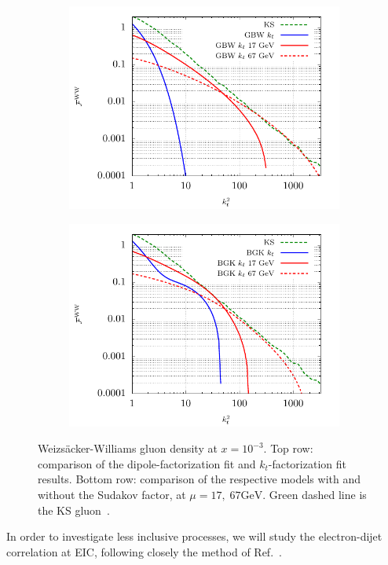 \documentclass[11pt]{article}
\numberwithin{equation}{section}
\numberwithin{table}{section}
\numberwithin{figure}{section}
\begin{document}
\begin{figure}[t]
\begin{subfigure}{0.5\textwidth}
        \includegraphics[width=\textwidth]{plots/GBWWW2} 
    \end{subfigure}
    \begin{subfigure}{0.5\textwidth}
        \includegraphics[width=\textwidth]{plots/BGKWW2} 
    \end{subfigure}
    \caption{\footnotesize Weizs\"acker-Williams gluon density at $x=10^{-3}$. Top row: comparison of the dipole-factorization fit and $k_t$-factorization fit results. Bottom row: comparison of the respective models with and without the Sudakov factor, at $\mu=17,\;67 \mathrm{GeV}$. Green dashed line is the KS gluon~\cite{vanHameren:2021sqc}. }
    \label{fig:ww}
\end{figure}
In order to investigate less inclusive processes, we will study the electron-dijet correlation at EIC, following closely the method of Ref.~\cite{vanHameren:2021sqc}. 
\end{document}
